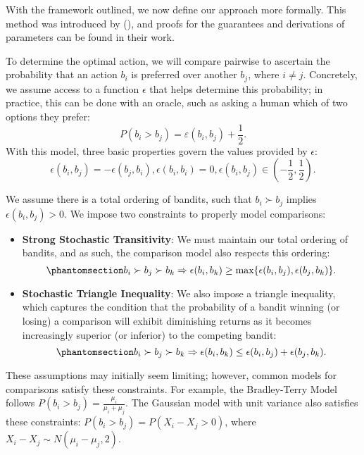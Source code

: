 \documentclass[
  letterpaper,
  numbers=noenddot,
  DIV=11]{scrreprt}
\theoremstyle{definition}
\theoremstyle{plain}
\theoremstyle{plain}
\theoremstyle{remark}
\begin{document}
With the framework outlined, we now define our approach more formally.
This method was introduced by (), and proofs for the guarantees and derivations of parameters can
be found in their work.

To determine the optimal action, we will compare pairwise to ascertain
the probability that an action \(b_i\) is preferred over another
\(b_j\), where \(i \ne j\). Concretely, we assume access to a function
\(\epsilon\) that helps determine this probability; in practice, this
can be done with an oracle, such as asking a human which of two options
they prefer: \[P(b_i > b_j) = \varepsilon(b_i, b_j) + \frac{1}{2}.\]
With this model, three basic properties govern the values provided by
\(\epsilon\):
\[\epsilon(b_i, b_j) = -\epsilon(b_j, b_i), \epsilon(b_i, b_i) = 0, \epsilon(b_i, b_j) \in \left(-\frac{1}{2}, \frac{1}{2} \right).\]

We assume there is a total ordering of bandits, such that
\(b_i \succ b_j\) implies \(\epsilon(b_i, b_j) > 0\). We impose two
constraints to properly model comparisons:

\begin{itemize}
\item
  \textbf{Strong Stochastic Transitivity}: We must maintain our total
  ordering of bandits, and as such, the comparison model also respects
  this ordering:
  \begin{equation}\phantomsection\label{eq-stochastic-transitivity}{b_i \succ b_j \succ b_k \Rightarrow \epsilon(b_i, b_k) \ge \text{max}\{\epsilon(b_i, b_j), \epsilon(b_j, b_k)\}.}\end{equation}
\item
  \textbf{Stochastic Triangle Inequality}: We also impose a triangle
  inequality, which captures the condition that the probability of a
  bandit winning (or losing) a comparison will exhibit diminishing
  returns as it becomes increasingly superior (or inferior) to the
  competing bandit:
  \begin{equation}\phantomsection\label{eq-triangle-inequality}{b_i \succ b_j \succ b_k \Rightarrow \epsilon(b_i, b_k) \le \epsilon(b_i, b_j) + \epsilon(b_j, b_k).}\end{equation}
\end{itemize}

These assumptions may initially seem limiting; however, common models
for comparisons satisfy these constraints. For example, the
Bradley-Terry Model follows
\(P(b_i > b_j) = \frac{\mu_i}{\mu_i + \mu_j}\). The Gaussian model with
unit variance also satisfies these constraints:
\(P(b_i > b_j) = P(X_i - X_j > 0)\), where
\(X_i - X_j \sim N(\mu_i - \mu_j, 2)\).
\end{document}
